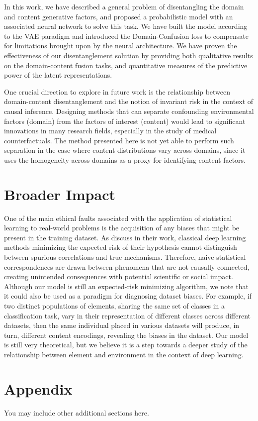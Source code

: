 \documentclass{article} %
\begin{document}
In this work, we have described a general problem of disentangling the domain and content generative factors, and proposed a probabilistic model with an associated neural network to solve this task. We have built the model according to the VAE paradigm and introduced the Domain-Confusion loss to compensate for limitations brought upon by the neural architecture. We have proven the effectiveness of our disentanglement solution by providing both qualitative results on the domain-content fusion tasks, and quantitative measures of the predictive power of the latent representations.

One crucial direction to explore in future work is the relationship between domain-content disentanglement and the notion of invariant risk \citet{arjovsky2019invariant} in the context of causal inference. Designing methods that can separate confounding environmental factors (domain) from the factors of interest (content) would lead to significant innovations in many research fields, especially in the study of medical counterfactuals. The method presented here is not yet able to perform such separation in the case where content distributions vary across domains, since it uses the homogeneity across domains as a proxy for identifying content factors.

\section{Broader Impact}

One of the main ethical faults associated with the application of statistical learning to real-world problems is the acquisition of any biases that might be present in the training dataset. As \citet{arjovsky2019invariant} discuss in their work, classical deep learning methods minimizing the expected risk of their hypothesis cannot distinguish between spurious correlations and true mechanisms. Therefore, naive statistical correspondences are drawn between phenomena that are not causally connected, creating unintended consequences with potential scientific or social impact. Although our model is still an expected-risk minimizing algorithm, we note that it could also be used as a paradigm for diagnosing dataset biases. For example, if two distinct populations of elements, sharing the same set of classes in a classification task, vary in their representation of different classes across different datasets, then the same individual placed in various datasets will produce, in turn, different content encodings, revealing the biases in the dataset. Our model is still very theoretical, but we believe it is a step towards a deeper study of the relationship between element and environment in the context of deep learning.




\appendix
\section{Appendix}
You may include other additional sections here.
\end{document}

